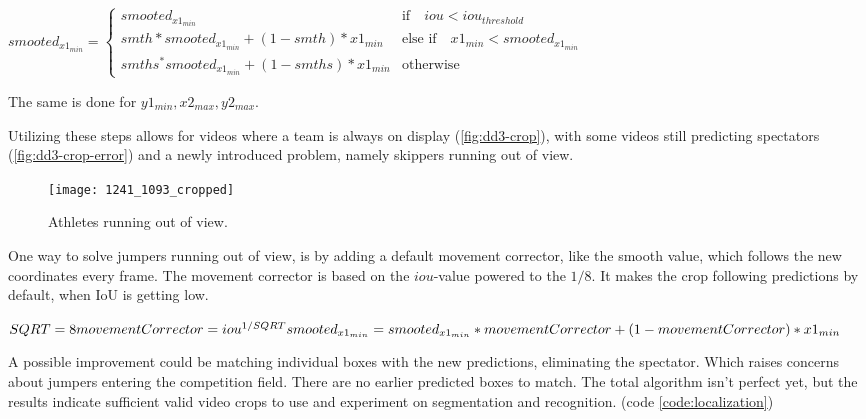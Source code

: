 \bigskip
\begin{math}
   smooted_{x1_{min}} =
   \begin{cases}
       smooted_{x1_{min}} & \text{if} \quad iou < iou_{threshold} \\
       smth * smooted_{x1_{min}} + (1-smth) * x1_{min} & \text{else if} \quad x1_{min} < smooted_{x1_{min}} \\
       smths^ * smooted_{x1_{min}} + (1-smths) * x1_{min} & \text{otherwise}
   \end{cases}
\end{math}
\medskip

The same is done for \( y1_{min}, x2_{max}, y2_{max} \).

Utilizing these steps allows for videos where a team is always on display (\ref{fig:dd3-crop}), with some videos still predicting spectators (\ref{fig:dd3-crop-error}) and a newly introduced problem, namely skippers running out of view.


\begin{figure}
    \centering
    \texttt{[image: 1241\_1093\_cropped]}
    \caption[dd3-crop-error]{Athletes running out of view.}
    \label{fig:dd3-crop-error-out-of-view}
\end{figure}

One way to solve jumpers running out of view, is by adding a default movement corrector, like the smooth value, which follows the new coordinates every frame. The movement corrector is based on the \(iou\)-value powered to the \(1/8\). It makes the crop following predictions by default, when IoU is getting low.

\medskip

\begin{math}
    SQRT = 8 \\
    movementCorrector = iou^{1/SQRT} \\
    smooted_{x1_{min}} = smooted_{x1_{min}} * movementCorrector + (1 - movementCorrector) * {x1_{min}}
\end{math}

\medskip

A possible improvement could be matching individual boxes with the new predictions, eliminating the spectator. Which raises concerns about jumpers entering the competition field. There are no earlier predicted boxes to match.
The total algorithm isn't perfect yet, but the results indicate sufficient valid video crops to use and experiment on segmentation and recognition. (code \ref{code:localization})

